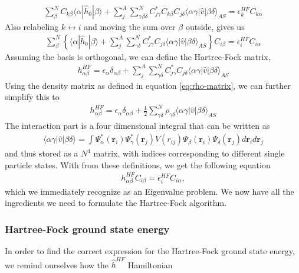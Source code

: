 \documentclass[11pt]{article}
\begin{document}
\begin{align*}
	\sum^N_{\beta} C_{k\beta} \langle\alpha|\hat{h}_0|\beta\rangle + \sum^A_{j}\sum^N_{\gamma\beta\delta} C^*_{j\gamma}C_{k\beta}C_{j\delta} \langle \alpha\gamma|\hat{v}|\beta\delta\rangle_{AS} = \epsilon_k^{HF} C_{k\alpha}
\end{align*}
Also relabeling $k \leftrightarrow i$ and moving the sum over $\beta$ outside, gives us
\begin{align*}
	\sum^N_{\beta} \left\{ \langle\alpha|\hat{h}_0|\beta\rangle + \sum^A_{j}\sum^N_{\gamma\delta} C^*_{j\gamma}C_{j\delta} \langle \alpha\gamma|\hat{v}|\beta\delta\rangle_{AS} \right\} C_{i\beta} = \epsilon_i^{HF} C_{i\alpha}
\end{align*}
Assuming the basis is orthogonal, we can define the Hartree-Fock matrix,
\begin{align}
	h^{HF}_{\alpha\beta} = \epsilon_\alpha\delta_{\alpha\beta} + \sum^A_{j}\sum^N_{\gamma\delta} C^*_{j\gamma}C_{j\delta} \langle \alpha\gamma|\hat{v}|\beta\delta\rangle_{AS}
	\label{eq:hartree-fock-matrix}
\end{align}
Using the density matrix as defined in equation \eqref{eq:rho-matrix}, we can further simplify this to
\begin{align}
	h^{HF}_{\alpha\beta} = \epsilon_\alpha\delta_{\alpha\beta} + \frac{1}{2}\sum^N_{\gamma\delta} \rho_{\gamma\delta} \langle \alpha\gamma|\hat{v}|\beta\delta\rangle_{AS}
	\label{eq:hartree-fock-matrix-rho}
\end{align}
The interaction part is a four dimensional integral that can be written as
\begin{align}
	\langle \alpha\gamma|\hat{v}|\beta\delta\rangle = \int \Psi_\alpha^*(\mathbf{r}_i) \Psi_\gamma^*(\mathbf{r}_j) V(r_{ij}) \Psi_\beta(\mathbf{r}_i) \Psi_\delta(\mathbf{r}_j) d\mathbf{r}_i d\mathbf{r}_j 
	\label{eq:interaction-matrix}
\end{align}
and thus stored as a $N^4$ matrix, with indices corresponding to different single particle states. With from these definitions, we get the following equation
\begin{align}
	h^{HF}_{\alpha\beta} C_{i\beta} = \epsilon_i^{HF} C_{i\alpha},
	\label{eq:eigen-value-problem}
\end{align}
which we immediately recognize as an Eigenvalue problem. We now have all the ingredients we need to formulate the Hartree-Fock algorithm.

\subsubsection{Hartree-Fock ground state energy}
In order to find the correct expression for the Hartree-Fock ground state energy, we remind ourselves how the $\hat{h}^{HF}$ Hamiltonian 
\end{document}
